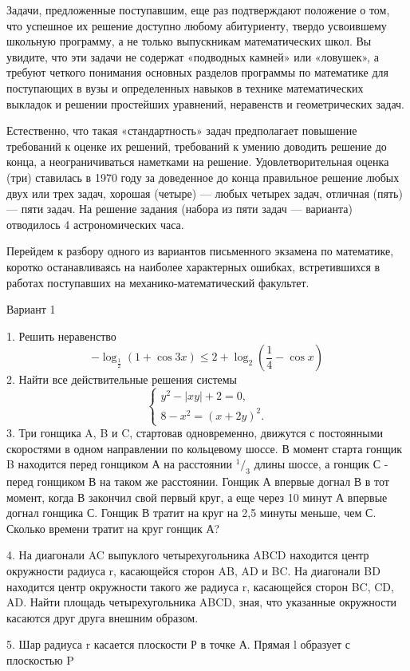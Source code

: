 \normalsize
\setlength{\parindent}{0.5cm}
\begin{justify}
\begin{multicols*}{2}
 {Задачи, предложенные поступавшим, еще раз подтверждают положение о том, что успешное их решение доступно любому абитуриенту, твердо усвоившему школьную программу, а не только выпускникам математических школ. Вы увидите, что эти задачи не содержат «подводных камней» или «ловушек», а требуют четкого понимания основных разделов программы по математике для поступающих в вузы и определенных навыков в технике математических выкладок и решении простейших уравнений, неравенств и геометрических задач.

Естественно, что такая «стандартность» задач предполагает повышение требований к оценке их решений, требований к умению доводить решение до конца, а неограничиваться наметками на решение. Удовлетворительная оценка (три) ставилась в 1970 году за доведенное до конца правильное решение любых двух или трех задач, хорошая (четыре) — любых четырех
задач, отличная (пять) — пяти задач. На решение задания (набора из пяти задач — варианта) отводилось 4 астрономических часа.

Перейдем к разбору одного из вариантов письменного экзамена по математике, коротко останавливаясь на наиболее характерных ошибках, встретившихся в работах поступавших на механико-математический факультет.
\setlength{\parindent}{0cm}

\breakline
\small
\begin{center}
Вариант 1
\end{center}
1. Решить неравенство
\[-\log_\frac{1}{2}(1 + \cos{3x}) \leq 2 + \log_2 (\frac{1}{4} - \cos{x}) \]
2. Найти все действительные решения системы
\begin{equation*}
    \begin{cases}
      y^{2} - |xy| + 2 = 0 ,\\8 - x^{2} = (x + 2y)^{2}.
      \end{cases}
\end{equation*}
3. Три гонщика A, B и C, стартовав одновременно, движутся с постоянными скоростями в одном направлении по кольцевому шоссе. В момент старта гонщик B находится перед гонщиком А на расстоянии $^1/_3$  длины шоссе, а гонщик С - перед гонщиком В на таком же расстоянии. Гонщик А впервые догнал В в тот момент, когда В закончил свой первый круг, а еще через 10 минут А впервые догнал гонщика С. Гонщик В тратит на круг на 2,5 минуты меньше, чем С. Сколько времени тратит на круг гонщик А?

4. На диагонали AC выпуклого четырехугольника ABCD находится центр окружности радиуса r, касающейся сторон AB, AD и BC. На диагонали BD находится центр окружности такого же радиуса r, касающейся сторон BC, CD, AD. Найти площадь четырехугольника ABCD, зная, что указанные окружности касаются друг друга внешним образом.

5. Шар радиуса r касается плоскости Р в точке А. Прямая l образует с плоскостью P
}
\end{multicols*}
\end{justify}

